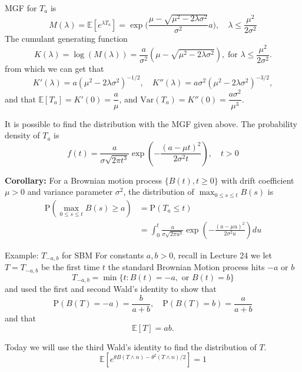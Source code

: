 \documentclass[letterpaper,handout]{beamer}
\def\p{\mathrm P}
\def\E{\mathbb E}
\def\V{\mathrm{Var}}
\begin{document}
\begin{frame}
MGF for $T_a$ is
$$
M(\lambda)=\E[e^{\lambda T_a}]=\exp\bigg(\frac{\mu-\sqrt{\mu^2-2\lambda\sigma^2}}{\sigma^2}a\bigg),\quad\lambda\le\frac{\mu^2}{2\sigma^2}
$$
The cumulant generating function
$$K(\lambda)=\log(M(\lambda))=\frac{a}{\sigma^2}(\mu-\sqrt{\mu^2-2\lambda\sigma^2}), \;\mbox{for }\lambda\le\frac{\mu^2}{2\sigma^2}.$$
from which we can get that
$$K'(\lambda)=a(\mu^2-2\lambda\sigma^2)^{-1/2},\quad K''(\lambda)=a\sigma^2(\mu^2-2\lambda\sigma^2)^{-3/2},$$
and that $\E[T_a]=K'(0)=\dfrac{a}{\mu}$, and $\V(T_a)=K''(0)=\dfrac{a\sigma^2}{\mu^3}.$
\end{frame}
\begin{frame}
It is possible to find the distribution with the MGF given above.
The probability density of $T_a$ is
$$
f(t)=\frac{a}{\sigma\sqrt{2\pi t^3}}\exp\left(-\frac{(a-\mu t)^2}{2\sigma^2t}\right),\quad t>0
$$\bigskip

\textbf{Corollary:}
For a Brownian motion process $\{B(t), t \ge 0\}$ with drift coefficient $\mu>0$ and variance parameter $\sigma^2$,
the distribution of $\max_{0\le s\le t}B(s)$ is
\begin{align*}
\p\left(\max_{0\le s\le t}B(s) \ge a\right) &= \p(T_a \le t)\\
&=\int_0^t\frac{a}{\sigma\sqrt{2\pi u^3}}\exp\left(-\frac{(a-\mu u)^2}{2\sigma^2u}\right)du
\end{align*}
\end{frame}
\begin{frame}{Example: $T_{-a,b}$ for SBM}
For constants $a,b>0$, recall in Lecture 24 we let $T=T_{-a,b}$ be the first time $t$ the standard Brownian Motion process hits $-a$ or $b$
$$
T_{-a,b}=\min\{t: B(t)=-a,\mbox{ or }B(t)=b\}
$$
and used the first and second Wald's identity to show that
$$\p(B(T)=-a)=\frac{b}{a+b},\quad\p(B(T)=b)=\frac{a}{a+b}$$
and that $$\E[T]=ab.$$

Today we will use the third Wald's identity to find the distribution of $T$.
$$\E[e^{\theta B(T\wedge n)-\theta^2(T\wedge n)/2}]=1$$
\end{frame}
\end{document}
